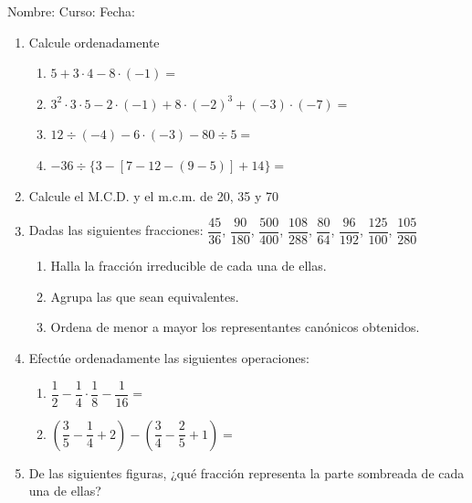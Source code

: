 \documentclass[fleqn]{article}
\newcommand{\LineaNombre}{%
\par
\vspace{\baselineskip}
Nombre:\hrulefill \; Curso: \underline{\hspace*{48pt}} \; Fecha: \underline{\hspace*{2.5cm}} \relax
\par}
\begin{document}
\LineaNombre
\begin{enumerate}
 \item Calcule ordenadamente
 \begin{enumerate}
 \item $5+3\cdot 4-8\cdot (-1)=$\noanswer[.2in]
 \item $3^{2}\cdot 3\cdot 5-2\cdot (-1)+8\cdot (-2)^{3}+(-3)\cdot (-7)=$\noanswer[.2in]
 \item $12\div (-4)-6\cdot (-3)-80\div 5 =$\noanswer[.2in]
 \item $-36\div \{3-[7-12-(9-5)]+14\}=$\noanswer[.2in]
 \end{enumerate}
 \item Calcule el M.C.D. y el m.c.m. de 20, 35 y 70 \noanswer[.75in]
 \item Dadas las siguientes fracciones: $\dfrac{45}{36}$, $\dfrac{90}{180}$, $\dfrac{500}{400}$, $\dfrac{108}{288}$, $\dfrac{80}{64}$, $\dfrac{96}{192}$, $\dfrac{125}{100}$, $\dfrac{105}{280}$
 \begin{enumerate}
 \item Halla la fracción irreducible de cada una de ellas.
 \item Agrupa las que sean equivalentes.
 \item Ordena de menor a mayor los representantes canónicos obtenidos.
 \end{enumerate}
 \noanswer
  \newpage
 \item Efectúe ordenadamente las siguientes operaciones:
 \begin{enumerate}
 \item $\dfrac{1}{2}-\dfrac{1}{4}\cdot \dfrac{1}{8}-\dfrac{1}{16}=$\noanswer[.5in]
 \item $\left(\dfrac{3}{5}-\dfrac{1}{4}+2\right)-\left(\dfrac{3}{4}-\dfrac{2}{5}+1\right)=$\noanswer[.5in]
 \end{enumerate}
 \item De las siguientes figuras, ¿qué fracción representa la parte sombreada de cada una de ellas?
 \begin{enumerate}
\end{enumerate}
\end{enumerate}
\end{document}
